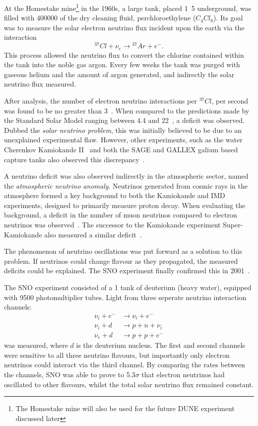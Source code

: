 At the Homestake mine\footnote{The Homestake mine will also be used for the future DUNE experiment
    discussed later} in the 1960s, a large tank, placed \unit{1.5}{} underground, was
filled with \unit{400000}{\litre} of the dry cleaning fluid, perchloroethylene
($C_{4}Cl_{8}$). Its goal was to measure the solar electron neutrino flux incident upon the
earth via the interaction
\begin{equation} %
    {}^{37}Cl+\nu_{e}\rightarrow{}^{37}Ar+e^{-}.
\end{equation} %
This process allowed the neutrino flux to convert the chlorine contained within the tank into the
noble gas argon. Every few weeks the tank was purged with gaseous helium and the amount of argon
generated, and indirectly the solar neutrino flux measured.

After analysis, the number of electron neutrino interactions per ${}^{37}Cl$, per second was found
to be no greater than 3~\cite{davis1968}. When compared to the predictions made by the Standard
Solar Model ranging between 4.4 and 22~\cite{bahcall1968}, a deficit was observed. Dubbed the
\emph{solar neutrino problem}, this was initially believed to be due to an unexplained
experimental flaw. However, other experiments, such as the water Cherenkov Kamiokande
II~\cite{hirata1989} and both the SAGE and GALLEX galium based capture tanks also observed this
discrepancy~\cite{abazov1991,anselmann1994}.

A neutrino deficit was also observed indirectly in the atmospheric sector, named the
\emph{atmospheric neutrino anomaly}. Neutrinos generated from cosmic rays in the atmosphere formed
a key background to both the Kamiokande and IMD experiments, designed to primarily measure proton
decay. When evaluating the background, a deficit in the number of muon neutrinos compared to
electron neutrinos was observed~\cite{hirata1988, becker1992}. The successor to the Kamiokande
experiment Super-Kamiokande also measured a similar deficit~\cite{kajita1999}.

The phenomenon of neutrino oscillations was put forward as a solution to this problem. If
neutrinos could change flavour as they propagated, the measured deficits could be explained. The
SNO experiment finally confirmed this in 2001~\cite{ahmad2002}.

The SNO experiment consisted of a \unit{1}{} tank of deuterium (heavy water),
equipped with 9500 photomultiplier tubes. Light from three seperate neutrino interaction channels:
\begin{align} %
    \nu_{i}+e^{-} & \rightarrow \nu_{i}+e^{-} \\
    \nu_{i}+d     & \rightarrow p+n+\nu_{i}   \\
    \nu_{e}+d     & \rightarrow p+p+e^{-}
\end{align}
was measured, where $d$ is the deuterium nucleus. The first and second channels were sensitive to
all three neutrino flavours, but importantly only electron neutrinos could interact via the third
channel. By comparing the rates between the channels, SNO was able to prove to 5.3$\sigma$ that
electron neutrinos had oscillated to other flavours, whilst the total solar neutrino flux remained
constant.

